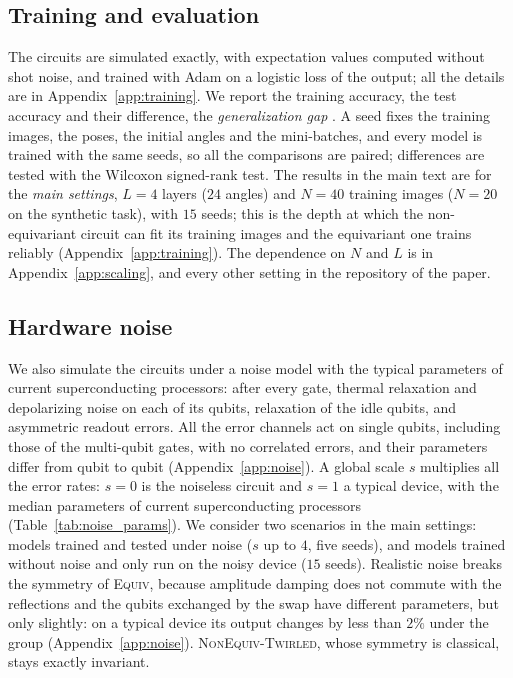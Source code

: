 \documentclass[aps,pra,reprint,superscriptaddress,longbibliography]{revtex4-2}
\newcommand{\Equiv}{\textsc{Equiv}}
\newcommand{\Twirled}{\textsc{NonEquiv-Twirled}}
\begin{document}
\subsection{Training and evaluation}\label{subsec:training}

The circuits are simulated exactly, with expectation values computed without shot noise, and trained with Adam on a logistic loss of the output; all the details are in Appendix~\ref{app:training}. We report the training accuracy, the test accuracy and their difference, the \emph{generalization gap} \cite{Pomarico2025}. A seed fixes the training images, the poses, the initial angles and the mini-batches, and every model is trained with the same seeds, so all the comparisons are paired; differences are tested with the Wilcoxon signed-rank test. The results in the main text are for the \emph{main settings}, $L=4$ layers ($24$ angles) and $N=40$ training images ($N=20$ on the synthetic task), with $15$ seeds; this is the depth at which the non-equivariant circuit can fit its training images and the equivariant one trains reliably (Appendix~\ref{app:training}). The dependence on $N$ and $L$ is in Appendix~\ref{app:scaling}, and every other setting in the repository of the paper.

\subsection{Hardware noise}\label{subsec:noise}

We also simulate the circuits under a noise model with the typical parameters of current superconducting processors: after every gate, thermal relaxation and depolarizing noise on each of its qubits, relaxation of the idle qubits, and asymmetric readout errors. All the error channels act on single qubits, including those of the multi-qubit gates, with no correlated errors, and their parameters differ from qubit to qubit (Appendix~\ref{app:noise}). A global scale $s$ multiplies all the error rates: $s=0$ is the noiseless circuit and $s=1$ a typical device, with the median parameters of current superconducting processors (Table~\ref{tab:noise_params}). We consider two scenarios in the main settings: models trained and tested under noise ($s$ up to $4$, five seeds), and models trained without noise and only run on the noisy device ($15$ seeds). Realistic noise breaks the symmetry of \Equiv, because amplitude damping does not commute with the reflections and the qubits exchanged by the swap have different parameters, but only slightly: on a typical device its output changes by less than $2\%$ under the group (Appendix~\ref{app:noise}). \Twirled, whose symmetry is classical, stays exactly invariant.
\end{document}

